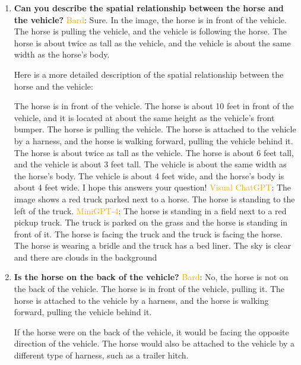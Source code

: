     \begin{enumerate}
        \item \textbf{Can you describe the spatial relationship between the horse and the vehicle?}
        \subitem \textcolor{orange}{Bard}:
        Sure. In the image, the horse is in front of the vehicle. The horse is pulling the vehicle, and the vehicle is following the horse. The horse is about twice as tall as the vehicle, and the vehicle is about the same width as the horse's body.

        Here is a more detailed description of the spatial relationship between the horse and the vehicle:

        The horse is in front of the vehicle. The horse is about 10 feet in front of the vehicle, and it is located at about the same height as the vehicle's front bumper.
        The horse is pulling the vehicle. The horse is attached to the vehicle by a harness, and the horse is walking forward, pulling the vehicle behind it.
        The horse is about twice as tall as the vehicle. The horse is about 6 feet tall, and the vehicle is about 3 feet tall.
        The vehicle is about the same width as the horse's body. The vehicle is about 4 feet wide, and the horse's body is about 4 feet wide.
        I hope this answers your question!
        \subitem \textcolor{orange}{Visual ChatGPT}: The image shows a red truck parked next to a horse. The horse is standing to the left of the truck.
        \subitem \textcolor{orange}{MiniGPT-4}: The horse is standing in a field next to a red pickup truck. The truck is parked on the grass and the horse is standing in front of it. The horse is facing the truck and the truck is facing the horse. The horse is wearing a bridle and the truck has a bed liner. The sky is clear and there are clouds in the background
        \item \textbf{Is the horse on the back of the vehicle?}
        \subitem \textcolor{orange}{Bard}: 
        No, the horse is not on the back of the vehicle. The horse is in front of the vehicle, pulling it. The horse is attached to the vehicle by a harness, and the horse is walking forward, pulling the vehicle behind it.
        
        If the horse were on the back of the vehicle, it would be facing the opposite direction of the vehicle. The horse would also be attached to the vehicle by a different type of harness, such as a trailer hitch.
        

\end{enumerate}
